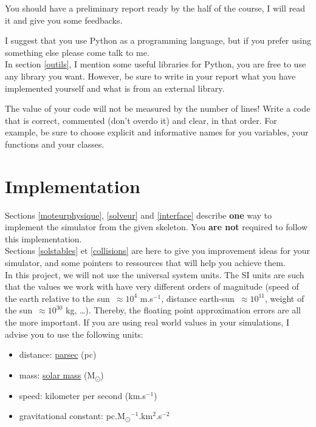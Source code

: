 \documentclass{article}
\begin{document}
You should have a preliminary report ready by the half of the course, I will read it and give you some feedbacks.

\vspace{1em}

\noindent I suggest that you use Python as a programming language, but if you prefer using something else please come talk to me.\\
In section \ref{outils}, I mention some useful libraries for Python, you are free to use any library you want. However, be sure to write in your report what you have implemented yourself and what is from an external library.

The value of your code will not be measured by the number of lines! Write a code that is correct, commented (don't overdo it) and clear, in that order. For example, be sure to choose explicit and informative names for you variables, your functions and your classes.

\section{Implementation}

Sections \ref{moteurphysique}, \ref{solveur} and \ref{interface} describe \textbf{one} way to implement the simulator from the given skeleton. You \textbf{are not} required to follow this implementation. \\
Sections \ref{solstables} et \ref{collisions} are here to give you improvement ideas for your simulator, and some pointers to ressources that will help you achieve them.\\
In this project, we will not use the universal system units. The SI units are such that the values we work with have very different orders of magnitude (speed of the earth relative to the sun~${\approx 10^4}$ m.s$^{-1}$, distance earth-sun~${\approx 10^{11}}$, weight of the sun~${\approx 10^{30}}$ kg, \dots). Thereby, the floating point approximation errors are all the more important. If you are using real world values in your simulations, I advise you to use the following units:
\begin{itemize}
    \item distance: \href{https://en.wikipedia.org/wiki/Parsec}{parsec} (pc)
    \item mass: \href{https://en.wikipedia.org/wiki/Solar_mass}{solar mass} (M\textsubscript{\(\odot\)})
    \item speed: kilometer per second (km.s$^{-1}$)
    \item gravitational constant: pc.M\textsubscript{\(\odot\)}$^{-1}$.km$^2$.s$^{-2}$
\end{itemize}
\end{document}
